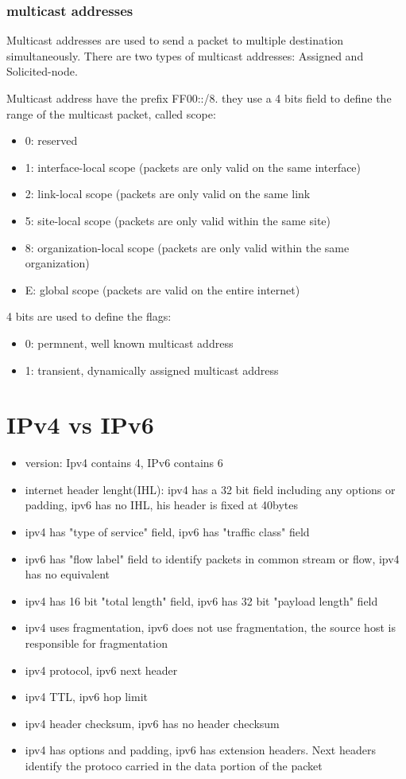 \subsection{multicast addresses}
Multicast addresses are used to send a packet to multiple destination simultaneously.
There are two types of multicast addresses: Assigned and Solicited-node.

Multicast address have the prefix FF00::/8. they use a 4 bits field to define the range of the multicast packet, called scope:
\begin{itemize}
    \item 0: reserved
    \item 1: interface-local scope (packets are only valid on the same interface)
    \item 2: link-local scope (packets are only valid on the same link
    \item 5: site-local scope (packets are only valid within the same site)
    \item 8: organization-local scope (packets are only valid within the same organization)
    \item E: global scope (packets are valid on the entire internet)
\end{itemize}

4 bits are used to define the flags:
\begin{itemize}
    \item 0: permnent, well known multicast address 
    \item 1: transient, dynamically assigned multicast address
\end{itemize}

\chapter{IPv4 vs IPv6}
\begin{itemize}
    \item version: Ipv4 contains 4, IPv6 contains 6
    \item internet header lenght(IHL): ipv4 has a 32 bit field including any options or padding, ipv6 has no IHL, his header is fixed at 40bytes
    \item ipv4 has "type of service" field, ipv6 has "traffic class" field 
    \item ipv6 has "flow label" field to identify packets in common stream or flow, ipv4 has no equivalent
    \item ipv4 has 16 bit "total length" field, ipv6 has 32 bit "payload length" field
    \item ipv4 uses fragmentation, ipv6 does not use fragmentation, the source host is responsible for fragmentation
    \item ipv4 protocol, ipv6 next header
    \item ipv4 TTL, ipv6 hop limit
    \item ipv4 header checksum, ipv6 has no header checksum
    \item ipv4 has options and padding, ipv6 has extension headers.  Next headers identify the protoco carried in the data portion of the packet 
\end{itemize}


